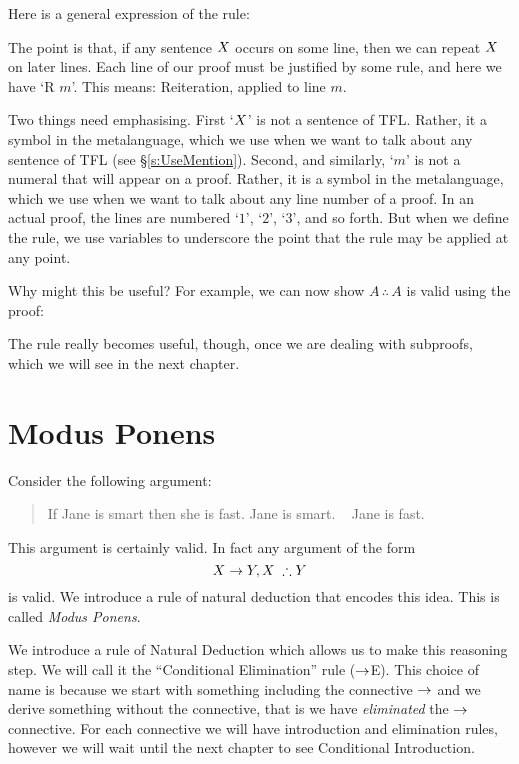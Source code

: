 Here is a general expression of the rule:
\begin{highlighted}
\begin{pf}
	\ellipsesline
	\ellipsesline
	 
\end{pf}
\end{highlighted}
The point is that, if any sentence $X$ occurs on some line, then we can repeat $X$ on later lines. Each line of our proof must be justified by some rule, and here we have `R $m$'. This means: Reiteration, applied to line $m$.

Two things need emphasising. First `$X$' is not a sentence of TFL. Rather, it a symbol in the metalanguage, which we use when we want to talk about any sentence of TFL (see \S\ref{s:UseMention}). Second, and similarly, `$m$' is not a numeral that will appear on a proof. Rather, it is a symbol in the metalanguage, which we use when we want to talk about any line number of a proof. In an actual proof, the lines are numbered `$1$', `$2$', `$3$', and so forth. But when we define the rule, we use variables to underscore the point that the rule may be applied at any point.

Why might this be useful? For example, we can now show $A\,\therefore\,A$ is valid using the proof:
\begin{pf}
\end{pf}
The rule really becomes useful, though, once we are dealing with subproofs, which we will see in the next chapter.

\section{Modus Ponens}
Consider the following argument:
	\begin{quote}
		If Jane is smart then she is fast. Jane is smart. \therefore~ Jane is fast.
	\end{quote}
This argument is certainly valid.
In fact any argument of the form $$\metaX\eif \metaY,\metaX\;\therefore\metaY$$ is valid. We introduce a rule of natural deduction that encodes this idea. This is
called \emph{Modus Ponens}.

We introduce a rule of Natural Deduction which allows us to make this reasoning step. We will call it the ``Conditional Elimination'' rule ($\rightarrow$E). This choice of name is because we {start} with something including the connective $\rightarrow$ and we derive something without the connective, that is we have \emph{eliminated} the $\rightarrow$ connective. For each connective we will have introduction and elimination rules, however we will wait until the next chapter to see Conditional Introduction.

